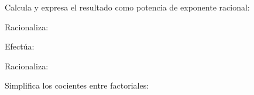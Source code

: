 \documentclass[addpoints,spanish, 12pt,a4paper]{exam}
\begin{document}
\begin{questions}
        \question Calcula y expresa el resultado como potencia de exponente racional:
        \begin{multicols}{1} 
        \end{multicols}
        \question Racionaliza:
        \begin{multicols}{1} 
        \end{multicols}
        \question Efectúa:
        \begin{multicols}{1} 
        \end{multicols}
        \question Racionaliza:
        \begin{multicols}{1} 
        \end{multicols}
        \question Simplifica los cocientes entre factoriales:

\end{questions}
\end{document}
